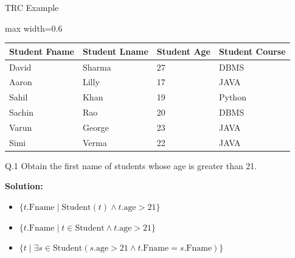 \documentclass[aspectratio=169, xcolor=dvipsnames]{beamer}
\begin{document}
\begin{frame}{TRC Example}
    \begin{center}
        \begin{adjustbox}{max width=0.6\textwidth}
        \begin{tabular}{|l|l|l|l|}
        \hline
        \textbf{Student Fname} & \textbf{Student Lname} & \textbf{Student Age} & \textbf{Student Course} \\ \hline
        David & Sharma & 27 & DBMS \\ \hline
        Aaron & Lilly & 17 & JAVA \\ \hline
        Sahil & Khan & 19 & Python \\ \hline
        Sachin & Rao & 20 & DBMS \\ \hline
        Varun & George & 23 & JAVA \\ \hline
        Simi & Verma & 22 & JAVA \\ \hline
        \end{tabular}
        \end{adjustbox}
    \end{center}
    Q.1 Obtain the first name of students whose age is greater than 21.
    
    \textbf{Solution:}
    \begin{itemize}[<+->]
        \item $\{t.\text{Fname} \mid \text{Student}(t) \land t.\text{age} > 21\}$
        \item $\{t.\text{Fname} \mid t \in \text{Student} \land t.\text{age} > 21\}$
        \item $\{t \mid \exists s \in \text{Student} (s.\text{age} > 21 \land t.\text{Fname} = s.\text{Fname})\}$
    \end{itemize}
\end{frame}
\end{document}
